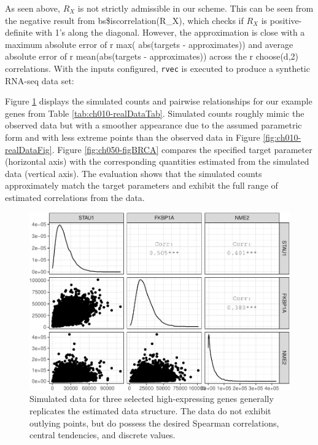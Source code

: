 \documentclass{article}
\newenvironment{Shaded}{\begin{snugshade}}{\end{snugshade}}
\newcommand{\DecValTok}[1]{\textcolor[rgb]{0.00,0.00,0.81}{#1}}
\newcommand{\FunctionTok}[1]{\textcolor[rgb]{0.00,0.00,0.00}{#1}}
\newcommand{\NormalTok}[1]{#1}
\newcommand{\OtherTok}[1]{\textcolor[rgb]{0.56,0.35,0.01}{#1}}
\newcommand{\SpecialCharTok}[1]{\textcolor[rgb]{0.00,0.00,0.00}{#1}}
\begin{document}
As seen above, \(R_X\) is not strictly admissible in our scheme. This
can be seen from the negative result from bs\$iscorrelation(R\_X), which
checks if \(R_X\) is positive-definite with 1's along the diagonal.
However, the approximation is close with a maximum absolute error of r
max( abs(targets - approximates)) and average absolute error of r
mean(abs(targets - approximates)) across the r choose(d,2) correlations.
With the inputs configured, \texttt{rvec} is executed to produce a
synthetic RNA-seq data set:

\begin{Shaded}
\end{Shaded}

Figure \ref{fig:ch050-simDataFig} displays the simulated counts and
pairwise relationships for our example genes from Table
\ref{tab:ch010-realDataTab}. Simulated counts roughly mimic the observed
data but with a smoother appearance due to the assumed parametric form
and with less extreme points than the observed data in Figure
\ref{fig:ch010-realDataFig}. Figure \ref{fig:ch050-figBRCA} compares the
specified target parameter (horizontal axis) with the corresponding
quantities estimated from the simulated data (vertical axis). The
evaluation shows that the simulated counts approximately match the
target parameters and exhibit the full range of estimated correlations
from the data.

\begin{figure}
\centering
\includegraphics{ch050-simDataFig-1.pdf}
\caption{\label{fig:ch050-simDataFig}Simulated data for three selected
high-expressing genes generally replicates the estimated data structure.
The data do not exhibit outlying points, but do possess the desired
Spearman correlations, central tendencies, and discrete values.}
\end{figure}
\end{document}
